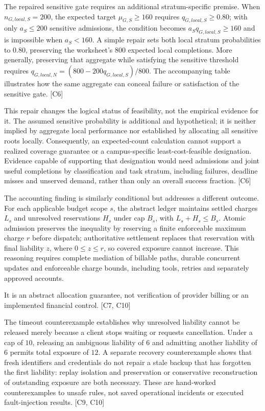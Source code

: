 \documentclass[11pt]{article}
\begin{document}
The repaired sensitive gate requires an additional stratum-specific premise. When $n_{G,local,S}=200$, the expected target $\mu_{G,S}\ge160$ requires $q_{G,local,S}\ge0.80$; with only $a_S\le200$ sensitive admissions, the condition becomes $a_Sq_{G,local,S}\ge160$ and is impossible when $a_S<160$. A simple repair sets both local stratum probabilities to $0.80$, preserving the worksheet\textquoteright{}s $800$ expected local completions. More generally, preserving that aggregate while satisfying the sensitive threshold requires $q_{G,local,N}=(800-200q_{G,local,S})/800$. The accompanying table illustrates how the same aggregate can conceal failure or satisfaction of the sensitive gate. [C6]

This repair changes the logical status of feasibility, not the empirical evidence for it. The assumed sensitive probability is additional and hypothetical; it is neither implied by aggregate local performance nor established by allocating all sensitive roots locally. Consequently, an expected-count calculation cannot support a realized coverage guarantee or a campus-specific least-cost-feasible designation. Evidence capable of supporting that designation would need admissions and joint useful completions by classification and task stratum, including failures, deadline misses and unserved demand, rather than only an overall success fraction. [C6]

The accounting finding is similarly conditional but addresses a different outcome. For each applicable budget scope $s$, the abstract ledger maintains settled charges $L_s$ and unresolved reservations $H_s$ under cap $B_s$, with $L_s+H_s\le B_s$. Atomic admission preserves the inequality by reserving a finite enforceable maximum charge $r$ before dispatch; authoritative settlement replaces that reservation with final liability $z$, where $0\le z\le r$, so covered exposure cannot increase. This reasoning requires complete mediation of billable paths, durable concurrent updates and enforceable charge bounds, including tools, retries and separately approved accounts.

It is an abstract allocation guarantee, not verification of provider billing or an implemented financial control. [C7, C10]

The timeout counterexample establishes why unresolved liability cannot be released merely because a client stops waiting or requests cancellation. Under a cap of $10$, releasing an ambiguous liability of $6$ and admitting another liability of $6$ permits total exposure of $12$. A separate recovery counterexample shows that fresh identifiers and credentials do not repair a stale backup that has forgotten the first liability: replay isolation and preservation or conservative reconstruction of outstanding exposure are both necessary. These are hand-worked counterexamples to unsafe rules, not saved operational incidents or executed fault-injection results. [C9, C10]
\end{document}
